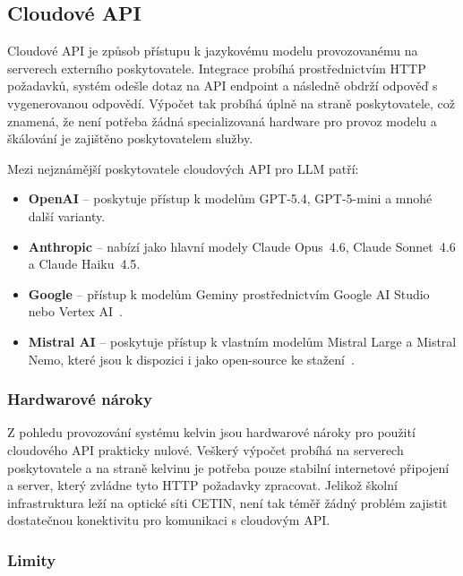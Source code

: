 \subsection{Cloudové API}
\label{subsec:deployment-cloud}

Cloudové API je způsob přístupu k jazykovému modelu provozovanému na serverech externího poskytovatele.
Integrace probíhá prostřednictvím HTTP požadavků, systém odešle dotaz na API endpoint a následně obdrží odpověď s vygenerovanou odpovědí.
Výpočet tak probíhá úplně na straně poskytovatele, což znamená, že není potřeba žádná specializovaná hardware pro provoz modelu a škálování je zajištěno poskytovatelem služby.

Mezi nejznámější poskytovatele cloudových API pro LLM patří:
\begin{itemize}
    \item \textbf{OpenAI} -- poskytuje přístup k modelům GPT-5.4, GPT-5-mini a mnohé další varianty\cite{openai_api}.
    \item \textbf{Anthropic} -- nabízí jako hlavní modely Claude Opus~4.6, Claude Sonnet~4.6 a Claude Haiku~4.5\cite{anthropic_api}.
    \item \textbf{Google} -- přístup k modelům Geminy prostřednictvím Google AI Studio nebo Vertex AI~\cite{google_vertex}.
    \item \textbf{Mistral AI} -- poskytuje přístup k vlastním modelům Mistral Large a Mistral Nemo, které jsou k dispozici i jako open-source ke stažení~\cite{mistral_api}.
\end{itemize}

\subsubsection*{Hardwarové nároky}
\label{subsubsec:deployment-cloud-hardware}

Z pohledu provozování systému kelvin jsou hardwarové nároky pro použití cloudového API prakticky nulové.
Veškerý výpočet probíhá na serverech poskytovatele a na straně kelvinu je potřeba pouze stabilní internetové připojení a server, který zvládne tyto HTTP požadavky zpracovat.
Jelikož školní infrastruktura leží na optické síti CETIN, není tak téměř žádný problém zajistit dostatečnou konektivitu pro komunikaci s cloudovým API\@.

\subsubsection*{Limity}
\label{subsubsec:deployment-cloud-limits}

